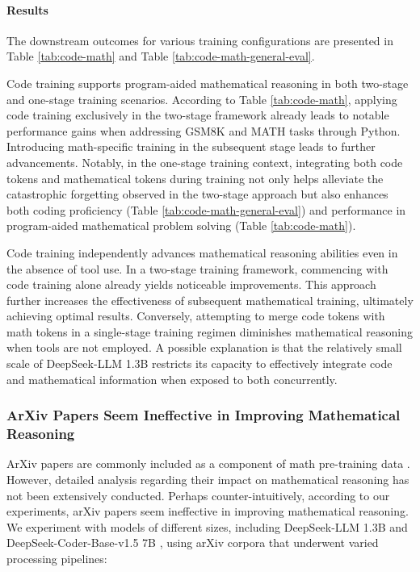 \begin{itemize}[topsep=0pt]
\begin{itemize}[topsep=0pt]
\paragraph{Results}
The downstream outcomes for various training configurations are presented in Table \ref{tab:code-math} and Table \ref{tab:code-math-general-eval}.

Code training supports program-aided mathematical reasoning in both two-stage and one-stage training scenarios. According to Table \ref{tab:code-math}, applying code training exclusively in the two-stage framework already leads to notable performance gains when addressing GSM8K and MATH tasks through Python. Introducing math-specific training in the subsequent stage leads to further advancements. Notably, in the one-stage training context, integrating both code tokens and mathematical tokens during training not only helps alleviate the catastrophic forgetting observed in the two-stage approach but also enhances both coding proficiency (Table \ref{tab:code-math-general-eval}) and performance in program-aided mathematical problem solving (Table \ref{tab:code-math}).

Code training independently advances mathematical reasoning abilities even in the absence of tool use. In a two-stage training framework, commencing with code training alone already yields noticeable improvements. This approach further increases the effectiveness of subsequent mathematical training, ultimately achieving optimal results. Conversely, attempting to merge code tokens with math tokens in a single-stage training regimen diminishes mathematical reasoning when tools are not employed. A possible explanation is that the relatively small scale of DeepSeek-LLM 1.3B restricts its capacity to effectively integrate code and mathematical information when exposed to both concurrently.

\subsubsection{ArXiv Papers Seem Ineffective in Improving Mathematical Reasoning}

ArXiv papers are commonly included as a component of math pre-training data \citep{minerva,gpt-f,llemma,mathpile}. However, detailed analysis regarding their impact on mathematical reasoning has not been extensively conducted. Perhaps counter-intuitively, according to our experiments, arXiv papers seem ineffective in improving mathematical reasoning. We experiment with models of different sizes, including DeepSeek-LLM 1.3B and DeepSeek-Coder-Base-v1.5 7B \citep{deepseek-coder}, using arXiv corpora that underwent varied processing pipelines:


\end{itemize}
\end{itemize}
